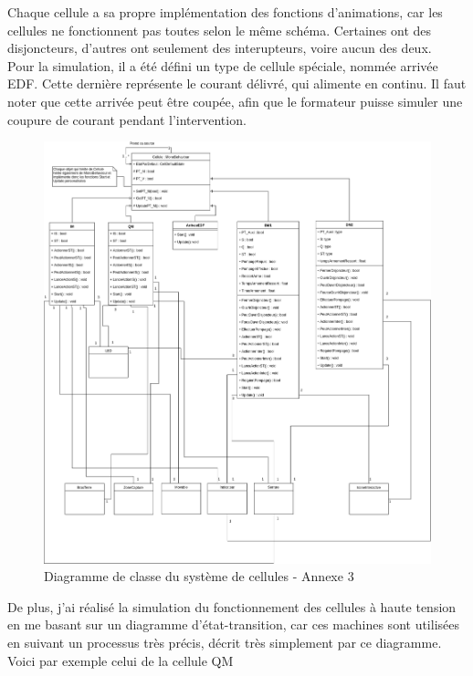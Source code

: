 \documentclass[a4paper]{article}
\begin{document}
    Chaque cellule a sa propre implémentation des fonctions d'animations, car les cellules ne fonctionnent pas toutes selon le même schéma. Certaines ont des disjoncteurs, d'autres ont seulement des interupteurs, voire aucun des deux. \\

    Pour la simulation, il a été défini un type de cellule spéciale, nommée arrivée EDF. Cette dernière représente le courant délivré, qui alimente en continu. Il faut noter que cette arrivée peut être coupée, afin que le formateur puisse simuler une coupure de courant pendant l'intervention. \\

    \begin{figure}[H]
        \centering
        \includegraphics[scale=0.35]{img/DiagClassCellules}
        \caption{Diagramme de classe du système de cellules - Annexe 3}
    \end{figure}

    De plus, j'ai réalisé la simulation du fonctionnement des cellules à haute tension en me basant sur un diagramme d'état-transition, car ces machines sont utilisées en suivant un processus très précis, décrit très simplement par ce diagramme. Voici par exemple celui de la cellule QM \\
\end{document}

